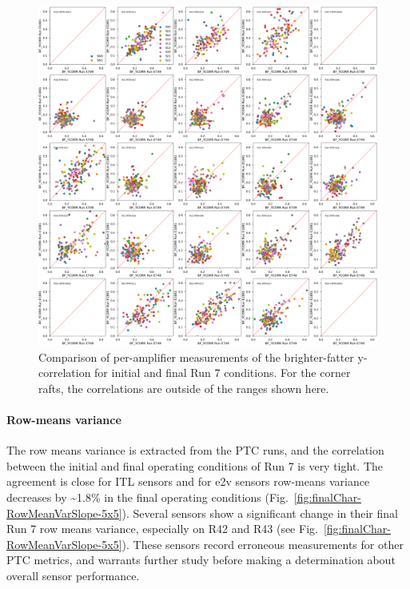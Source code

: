 \begin{figure}[ht]
    \centering
    \includegraphics[width=0.7\linewidth]{figures/finalCharacterization/E749_E1881_BF_YCORR.png}
    \caption{Comparison of per-amplifier measurements of the brighter-fatter y-correlation for initial and final Run 7 conditions. For the corner rafts, the correlations are outside of the ranges shown here.}
    \label{fig:finalChar-BFYCorr-5x5}
\end{figure}


\clearpage
\paragraph{Row-means variance}\label{final-row-means-var}

The row means variance is extracted from the PTC runs, and the correlation between the initial and final operating conditions of Run 7 is very tight. The agreement is close for ITL sensors and for e2v sensors row-means variance decreases by \textasciitilde1.8\% in the final operating conditions (Fig.~\ref{fig:finalChar-RowMeanVarSlope-5x5}). Several sensors show a significant change in their final Run 7 row means variance, especially on R42 and R43 (see Fig.~\ref{fig:finalChar-RowMeanVarSlope-5x5}). These sensors record erroneous measurements for other PTC metrics, and warrants further study before making a determination about overall sensor performance.

